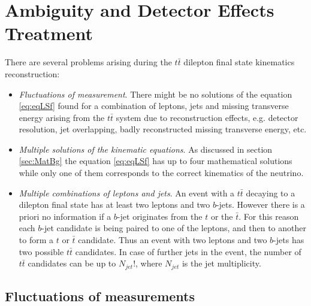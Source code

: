
\section{Ambiguity and Detector Effects Treatment}\label{sec:SolSer}

There are several problems arising during the $t\bar{t}$ dilepton final state kinematics reconstruction:

\begin{itemize}
 \item \textit{Fluctuations of measurement}. There might be no solutions of the equation \ref{eq:eqLSf} found for a combination
 of leptons, jets and missing transverse energy arising from the $t\bar{t}$ system due to reconstruction effects, e.g. detector resolution,
 jet overlapping, badly reconstructed missing transverse energy, etc.
 \item \textit{Multiple solutions of the kinematic equations}. As discussed in section \ref{sec:MatBg} the equation \ref{eq:eqLSf}
 has up to four mathematical solutions while only one of them corresponds to the correct kinematics of the neutrino.
 \item \textit{Multiple combinations of leptons and jets}. An event with a $t\bar{t}$ decaying to a dilepton final state has at least two leptons and two
 $b$-jets. However there is a priori no information if a $b$-jet originates from the $t$ or the $\bar{t}$. For this reason each $b$-jet candidate is being 
 paired to one of the leptons, and then to another
 to form a $t$ or $\bar{t}$ candidate. Thus an event with two leptons and two $b$-jets has two possible $t\bar{t}$ candidates. In case of further jets
 in the event, the number of $t\bar{t}$ candidates can be up to $N_{jet}!$, where $N_{jet}$ is the jet multiplicity.
\end{itemize}


\subsection{Fluctuations of measurements}\label{ssec:smear}

